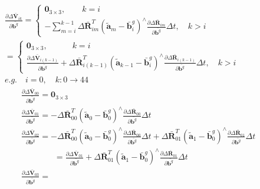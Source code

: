 \documentclass{article}
\begin{document}
\begin{CJK*}{GBK}{song}
\begin{equation}\left.\begin{aligned}&
\frac{\partial{\Delta \bar{\mathbf{V}}_{ik}}}{\partial{\bar{\mathbf{b}^g}}} =
\left\{
\begin{aligned}
\mathbf{0}_{3\times{3}},\qquad k=i
\\
-\sum_{m=i}^{k-1}\Delta \bar{\mathbf{R}}_{im}^{T}(\tilde{\boldsymbol{a}}_{m} - \bar{\mathbf{b}}_i^{g})^{\wedge}
\frac{\partial{\Delta \bar{\mathbf{R}}_{im}}}{\partial{\bar{\mathbf{b}^g}}}\Delta{t},\quad k>i
\end{aligned}
\right.
\\&
=
\left\{
\begin{aligned}
\mathbf{0}_{3\times{3}},\qquad \quad k=i
\\
\frac{\partial{\Delta \bar{\mathbf{V}}_{i(k-1)}}}{\partial{\bar{\mathbf{b}^g}}}
+\Delta \bar{\mathbf{R}}_{i(k-1)}^{T}(\tilde{\boldsymbol{a}}_{k-1} - \bar{\mathbf{b}}_i^{g})^{\wedge}
\frac{\partial{\Delta \bar{\mathbf{R}}_{i(k-1)}}}{\partial{\bar{\mathbf{b}^g}}}\Delta{t}
,\quad k>i
\end{aligned}
\right.
\\&
e.g. \quad i=0, \quad k:0\rightarrow{44}
\\&
\qquad \frac{\partial{\Delta \bar{\mathbf{V}}_{00}}}{\partial{\bar{\mathbf{b}^g}}} = \mathbf{0}_{3\times{3}}
\\&
\qquad \frac{\partial{\Delta \bar{\mathbf{V}}_{01}}}{\partial{\bar{\mathbf{b}^g}}} = 
-\Delta \bar{\mathbf{R}}_{00}^{T}(\tilde{\boldsymbol{a}}_{0} - \bar{\mathbf{b}}_0^{g})^{\wedge}
\frac{\partial{\Delta \bar{\mathbf{R}}_{00}}}{\partial{\bar{\mathbf{b}^g}}}\Delta{t}
\\&
\qquad \frac{\partial{\Delta \bar{\mathbf{V}}_{02}}}{\partial{\bar{\mathbf{b}^g}}} = 
-\Delta \bar{\mathbf{R}}_{00}^{T}(\tilde{\boldsymbol{a}}_{0} - \bar{\mathbf{b}}_0^{g})^{\wedge}
\frac{\partial{\Delta \bar{\mathbf{R}}_{00}}}{\partial{\bar{\mathbf{b}^g}}}\Delta{t}
+
\Delta \bar{\mathbf{R}}_{01}^{T}(\tilde{\boldsymbol{a}}_{1} - \bar{\mathbf{b}}_0^{g})^{\wedge}
\frac{\partial{\Delta \bar{\mathbf{R}}_{01}}}{\partial{\bar{\mathbf{b}^g}}}\Delta{t}
\\&
\qquad \qquad \qquad = \frac{\partial{\Delta \bar{\mathbf{V}}_{01}}}{\partial{\bar{\mathbf{b}^g}}}
+\Delta \bar{\mathbf{R}}_{01}^{T}(\tilde{\boldsymbol{a}}_{1} - \bar{\mathbf{b}}_0^{g})^{\wedge}
\frac{\partial{\Delta \bar{\mathbf{R}}_{01}}}{\partial{\bar{\mathbf{b}^g}}}\Delta{t}
\\&
\qquad \frac{\partial{\Delta \bar{\mathbf{V}}_{03}}}{\partial{\bar{\mathbf{b}^g}}} = 

\end{aligned}
\end{equation}
\end{CJK*}
\end{document}
